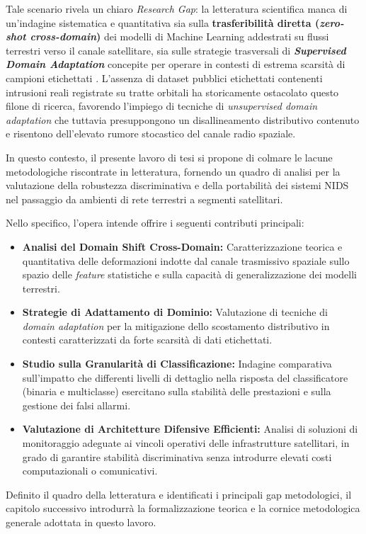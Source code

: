Tale scenario rivela un chiaro \textit{Research Gap}: la letteratura scientifica manca di un'indagine sistematica e quantitativa sia sulla \textbf{trasferibilità diretta (\textit{zero-shot cross-domain})} dei modelli di Machine Learning addestrati su flussi terrestri verso il canale satellitare, sia sulle strategie trasversali di \textbf{\textit{Supervised Domain Adaptation}} concepite per operare in contesti di estrema scarsità di campioni etichettati \cite{kodheli2021, azar2023}. 
L'assenza di dataset pubblici etichettati contenenti intrusioni reali registrate su tratte orbitali ha storicamente ostacolato questo filone di ricerca, favorendo l'impiego di tecniche di \textit{unsupervised domain adaptation} \cite{wilson2020} che tuttavia presuppongono un disallineamento distributivo contenuto e risentono dell'elevato rumore stocastico del canale radio spaziale.

In questo contesto, il presente lavoro di tesi si propone di colmare le lacune metodologiche riscontrate in letteratura, fornendo un quadro di analisi per la valutazione della robustezza discriminativa e della portabilità dei sistemi NIDS nel passaggio da ambienti di rete terrestri a segmenti satellitari. 

Nello specifico, l'opera intende offrire i seguenti contributi principali:
\begin{itemize}
    \item \textbf{Analisi del Domain Shift Cross-Domain:} Caratterizzazione teorica e quantitativa delle deformazioni indotte dal canale trasmissivo spaziale sullo spazio delle \textit{feature} statistiche e sulla capacità di generalizzazione dei modelli terrestri.
    \item \textbf{Strategie di Adattamento di Dominio:} Valutazione di tecniche di \textit{domain adaptation} per la mitigazione dello scostamento distributivo in contesti caratterizzati da forte scarsità di dati etichettati.
    \item \textbf{Studio sulla Granularità di Classificazione:} Indagine comparativa sull'impatto che differenti livelli di dettaglio nella risposta del classificatore (binaria e multiclasse) esercitano sulla stabilità delle prestazioni e sulla gestione dei falsi allarmi.
    \item \textbf{Valutazione di Architetture Difensive Efficienti:} Analisi di soluzioni di monitoraggio adeguate ai vincoli operativi delle infrastrutture satellitari, in grado di garantire stabilità discriminativa senza introdurre elevati costi computazionali o comunicativi.
\end{itemize}

Definito il quadro della letteratura e identificati i principali gap metodologici, il capitolo successivo introdurrà la formalizzazione teorica e la cornice metodologica generale adottata in questo lavoro. 
